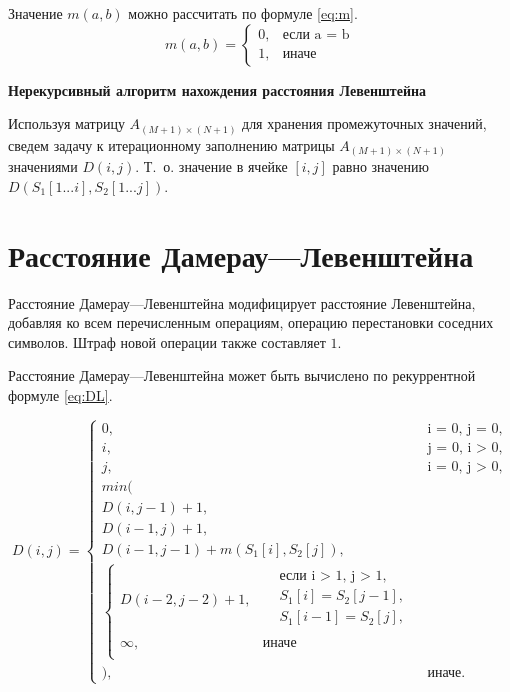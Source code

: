 Значение $ m(a, b) $ можно рассчитать по формуле \eqref{eq:m}.
\begin{equation}
	\label{eq:m}
	m(a, b) = \begin{cases}
		0, &\text{если a = b}\\
		1, &\text{иначе}
	\end{cases}
\end{equation}

\textbf{Нерекурсивный алгоритм нахождения расстояния Левенштейна}

Используя матрицу $ A_{(M+1) \times (N+1)} $ для хранения промежуточных значений, сведем задачу к итерационному заполнению матрицы $ A_{(M+1) \times (N+1)} $ значениями $ D(i, j) $. Т.~о. значение в ячейке $ [i, j] $ равно значению $ D(S_1[1...i], S_2[1...j]) $.

\section{Расстояние Дамерау---Левенштейна}

Расстояние Дамерау---Левенштейна модифицирует расстояние Левенштейна, добавляя ко всем перечисленным операциям, операцию перестановки соседних символов. Штраф новой операции также составляет $ 1 $. 

Расстояние Дамерау---Левенштейна может быть вычислено по рекуррентной формуле \eqref{eq:DL}.

\begin{equation}
	\label{eq:DL}
	D(i, j) = 
	\begin{cases}
		0, &\text{i = 0, j = 0,}\\
		i, &\text{j = 0, i > 0,}\\
		j, &\text{i = 0, j > 0,}\\
		min(\\
		D(i, j - 1) + 1,\\
		D(i - 1, j) + 1,\\ 
		D(i - 1, j - 1) + m(S_{1}[i], S_{2}[j]), \\
		\begin{cases}
			D(i - 2, j - 2) + 1, & \begin{aligned}
				& \text{если i > 1, j > 1}, \\
				& S_{1}[i] = S_{2}[j - 1], \\
				& S_{1}[i - 1] = S_{2}[j], \\
			\end{aligned}\\
			\infty, & \textrm{иначе} \\
		\end{cases} \\
		), & \textrm{иначе.}
	\end{cases}
\end{equation}

